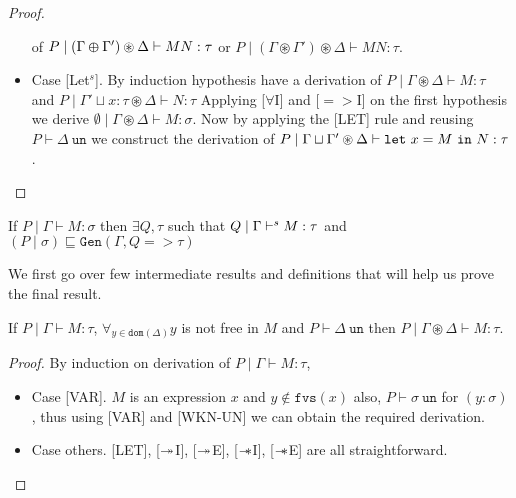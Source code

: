 \begin{proof}
\begin{itemize}
    of $P \mid (\Gamma \varoplus \Gamma') \circledast \Delta \vdash M N:\tau$ or $P \mid (\Gamma \circledast \Gamma') \circledast \Delta \vdash M N:\tau$.
  \item{Case [Let$^s$].}
    By induction hypothesis have a derivation of $P \mid \Gamma \circledast \Delta \vdash M: \tau$ and $P \mid \Gamma' \sqcup x:\tau \circledast \Delta \vdash N:\tau$
    Applying [$\forall$I] and [$=>$I] on the first hypothesis we derive $\emptyset \mid \Gamma \circledast \Delta \vdash M: \sigma$. Now by applying
    the [LET] rule and reusing $P \vdash \Delta\ \texttt{un}$ we construct the derivation of
    $P \mid \Gamma \sqcup \Gamma' \circledast \Delta \vdash \texttt{let}\ x = M\ \texttt{in}\ N:\tau$.\qedhere
  \end{itemize}
\end{proof}


\begin{theorem}\label{thm:completeness-syntax-directed}
  If $P \mid \Gamma \vdash M:\sigma$ then
  $\exists Q, \tau$ such that $Q \mid \Gamma \vdash^s M:\tau$
  and $(P \mid \sigma) \sqsubseteq \texttt{Gen}(\Gamma, Q => \tau)$
\end{theorem}

We first go over few intermediate results and definitions that will help us prove the final result.

\begin{lemma}\label{lemma:WKN-UN-helper}
  If $P \mid \Gamma \vdash M:\tau$, $\forall_{y \in \texttt{dom}(\Delta)} y$ is not free in $M$ and $P \vdash \Delta\ \texttt{un}$
  then $P \mid \Gamma \circledast \Delta \vdash M:\tau$.
\end{lemma}
\begin{proof}
  By induction on derivation of $P \mid \Gamma \vdash M:\tau$,
  \begin{itemize}
  \item{Case [VAR].} $M$ is an expression $x$ and $y \notin \texttt{fvs}(x)$ also, $P \vdash \sigma\ \texttt{un}$ for $(y:\sigma)$, thus
    using [VAR] and [WKN-UN] we can obtain the required derivation.
  \item{Case others.} [LET], [$\twoheadrightarrow$I], [$\twoheadrightarrow$E], [$\mathrel{-\mkern-6mu*}$I], [$\mathrel{-\mkern-6mu*}$E] are all straightforward.\qedhere
  \end{itemize}
\end{proof}

